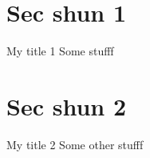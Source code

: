 \documentclass{beamer}
\begin{document}
\section{Sec shun 1}
\begin{frame}{My title 1}
Some stufff
\end{frame}


\section{Sec shun 2}
\begin{frame}{My title 2}
Some other stufff
\end{frame}
\end{document}
